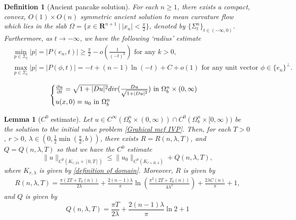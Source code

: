 \documentclass[10pt,a4paper]{amsart}
\newtheorem{definition}{Definition}
\newtheorem{lemma}{Lemma}
\begin{document}
\begin{definition}[Ancient pancake solution]\label{def of ancient pancake}
For each $n \geq 1$, there exists a compact, convex, $O(1)\times O(n)$ symmetric ancient solution to mean curvature flow which lies in the slab
$\Omega = \{x \in \mathbf{R}^{n+1}\ 
 |\ |x_n| < \frac{\pi}{2}\}$, denoted by $\{\Sigma^n_t\}_{t \in (-\infty, 0)}$. Furthermore, as $t \to -\infty$, we have the following `radius' estimate
\begin{align}\label{model pancake asymptotic data}
   & \min_{p \in \Sigma_t}|p| = |P(e_n, t)| \geq \frac{\pi}{2} - o(\frac{1}{(-t)^k}) \text{ for any }k > 0, \\ &\max_{p \in \Sigma_t}|p| = |P(\phi, t)| = -t + (n-1)\ln(-t) + C + o(1) \text{ for any unit vector $\phi \in \{e_n\}^{\perp}$.} 
\end{align}
\end{definition}

    \begin{equation}\label{Grahical mcf IVP}
        \begin{cases}
         \frac{\partial u}{\partial t} = \sqrt{1 + |Du|^2}\textit{\emph{div}}(\frac{Du}{\sqrt{1 + |Du|^2}}) \text{ in }\Omega^n_b \times (0,\infty) \\
         u(x, 0) = u_0 \text{ in }\Omega^n_b
        \end{cases}
    \end{equation}

\begin{lemma}[$C^0$ estimate]\label{C^0 estimate}
    Let $u \in C^{\infty}(\Omega^n_b \times (0, \infty)) \cap C^0(\Omega^n_b \times [0, \infty))$ be the solution to the initial value problem \eqref{Grahical mcf IVP}. Then, for each $T > 0$, $r > 0$, $\lambda \in (0,\frac{1}{2}\min(\frac{\pi}{2},b))$, there exists $R = R(n, \lambda, T)$, and $Q = Q(n,\lambda, T)$ so that we have the $C^0$ estimate
 \begin{equation}\label{C0 estimate equation}
     \|u\|_{C^0(K_{r, 2\lambda}\times [0, T])} \leq \|u_0\|_{C^0(K_{ r + R, \lambda})} + Q(n, \lambda, T),
 \end{equation}
 where $K_{ r, \lambda}$ is given by \eqref{definition of domain}.  Moreover, $R$ is given by
\begin{align}\label{radius equation}
    R(n, \lambda,  T) = \frac{\pi (2T + T_0(n))}{2\lambda} + \frac{2(n-1)\lambda}{\pi}\ln (\frac{\pi^2(2T + T_0(n))}{4\lambda^2})+ \frac{2\lambda C(n)}{\pi} + 1,
\end{align}
and $Q$ is given by
\begin{equation}\label{extra c0 quantity estimate}
    Q(n, \lambda, T) = \frac{\pi T}{2\lambda} + \frac{2(n-1)\lambda}{\pi}\ln 2 + 1
\end{equation}
\end{lemma}
\end{document}
